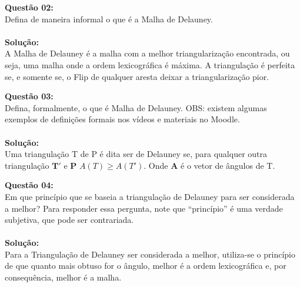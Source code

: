 \noindent\textbf{Questão 02:}\\
Defina de maneira informal o que é a Malha de Delauney.\\
\\
\noindent\textbf{Solução:}\\
A Malha de Delauney é a malha com a melhor triangularização encontrada, ou seja, uma malha onde a ordem lexicográfica é máxima. A triangulação é perfeita se, e somente se, o Flip de qualquer aresta deixar a triangularização pior.
\vspace{0.7cm}

\noindent\textbf{Questão 03:}\\
Defina, formalmente, o que é Malha de Delauney. OBS: existem algumas exemplos de
definições formais nos vídeos e materiais no Moodle.\\
\\
\noindent\textbf{Solução:}\\
Uma triangulação T de P é dita ser de Delauney se, para qualquer outra triangulação $\mathbf{T'}$ e $\mathbf{P}$ \rightarrow $A(T) \geq A(T')$. Onde $\mathbf{A}$ é o vetor de ângulos de T.
\vspace{0.7cm}

\noindent\textbf{Questão 04:}\\
Em que princípio que se baseia a triangulação de Delauney para ser considerada a
melhor? Para responder essa pergunta, note que “princípio” é uma verdade subjetiva,
que pode ser contrariada.\\
\\
\noindent\textbf{Solução:}\\
Para a Triangulação de Delauney ser considerada a melhor, utiliza-se o princípio de que quanto mais obtuso for o ângulo, melhor é a ordem lexicográfica e, por consequência, melhor é a malha.
\vspace{1cm}

